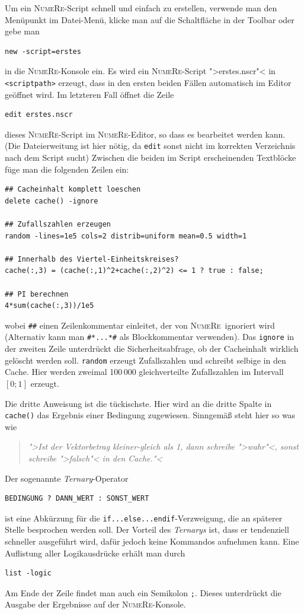 \documentclass[DIV=14,headsepline,footsepline]{scrbook}
\newcommand{\NR}{\textsc{Nu\-me\-Re}}
\begin{document}
				Um ein \NR-Script schnell und einfach zu erstellen, verwende man den Menüpunkt im Datei-Menü, klicke man auf die Schaltfläche in der Toolbar oder gebe man 
				\begin{lstlisting}
new -script=erstes
				\end{lstlisting}
				in die \NR-Konsole ein. Es wird ein \NR-Script ">erstes.nscr"< in \lstinline+<scriptpath>+ erzeugt, dass in den ersten beiden Fällen automatisch im Editor geöffnet wird. Im letzteren Fall öffnet die Zeile
				\begin{lstlisting}
edit erstes.nscr
				\end{lstlisting}
				dieses \NR-Script im \NR-Editor, so dass es bearbeitet werden kann. (Die Dateierweitung ist hier nötig, da \lstinline+edit+ sonst nicht im korrekten Verzeichnis nach dem Script sucht) Zwischen die beiden im Script erscheinenden Textblöcke füge man die folgenden Zeilen ein:
				\begin{lstlisting}
## Cacheinhalt komplett loeschen
delete cache() -ignore

## Zufallszahlen erzeugen
random -lines=1e5 cols=2 distrib=uniform mean=0.5 width=1

## Innerhalb des Viertel-Einheitskreises?
cache(:,3) = (cache(:,1)^2+cache(:,2)^2) <= 1 ? true : false;

## PI berechnen
4*sum(cache(:,3))/1e5
				\end{lstlisting}
				wobei \lstinline+##+ einen Zeilenkommentar einleitet, der von \NR\ ignoriert wird (Alternativ kann man \lstinline+#*...*#+ als Blockkommentar verwenden). Das \lstinline+ignore+ in der zweiten Zeile unterdrückt die Sicherheitsabfrage, ob der Cacheinhalt wirklich gelöscht werden soll. \lstinline+random+ erzeugt Zufallszahlen und schreibt selbige in den Cache. Hier werden zweimal 100\,000 gleichverteilte Zufallszahlen im Intervall $[0;1]$ erzeugt.
				
				Die dritte Anweisung ist die tückischste. Hier wird an die dritte Spalte in \lstinline+cache()+ das Ergebnis einer Bedingung zugewiesen. Sinngemäß steht hier so was wie
				\begin{quotation}
					\noindent\emph{">Ist der Vektorbetrag kleiner-gleich als 1, dann schreibe ">wahr"<, sonst schreibe ">falsch"< in den Cache."<}
				\end{quotation}
				Der sogenannte \emph{Ternary}-Operator
				\begin{lstlisting}
BEDINGUNG ? DANN_WERT : SONST_WERT
				\end{lstlisting}
				ist eine Abkürzung für die \lstinline+if...else...endif+-Verzweigung, die an späterer Stelle besprochen werden soll. Der Vorteil des \emph{Ternarys} ist, dass er tendenziell schneller ausgeführt wird, dafür jedoch keine Kommandos aufnehmen kann. Eine Auflistung aller Logikausdrücke erhält man durch
				\begin{lstlisting}
list -logic
				\end{lstlisting}
				Am Ende der Zeile findet man auch ein Semikolon \lstinline+;+. Dieses unterdrückt die Ausgabe der Ergebnisse auf der \NR-Konsole.
				
\end{document}
